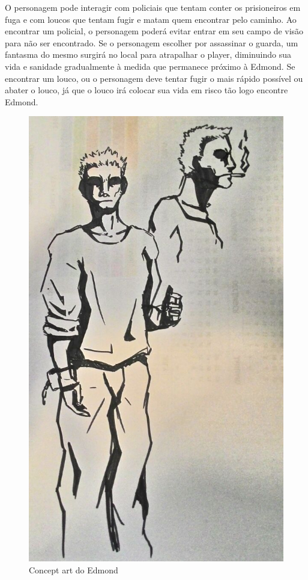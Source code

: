\documentclass[12pt]{article}
\begin{document}
O personagem pode interagir com policiais que tentam conter os prisioneiros em fuga e com loucos que tentam fugir e matam quem encontrar pelo caminho. Ao encontrar um policial, o personagem poderá evitar entrar em seu campo de visão para não ser encontrado. Se o personagem escolher por assassinar o guarda, um fantasma do mesmo surgirá no local para atrapalhar o player, diminuindo sua vida e sanidade gradualmente à medida que permanece próximo à Edmond. Se encontrar um louco, ou o personagem deve tentar fugir o mais rápido possível ou abater o louco, já que o louco irá colocar sua vida em risco tão logo encontre Edmond.

\begin{figure}[h]
    \centering
    \caption{Concept art do Edmond}
     \includegraphics[keepaspectratio=true,scale=0.30]{images/Prev_Ed.png}
\end{figure}
\end{document}

